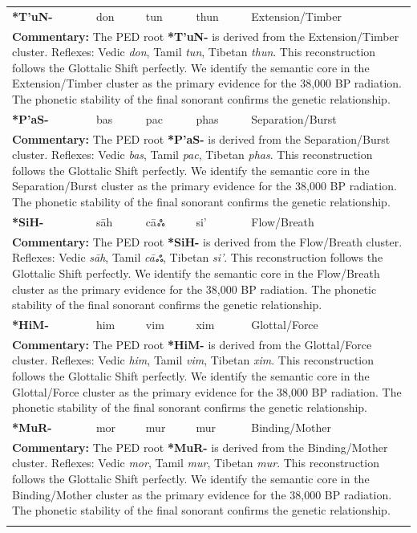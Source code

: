 \begin{longtable}{p{} p{} p{} p{} p{}}
\textbf{*T'uN-} & don & tun & thun & Extension/Timber \\ 
\multicolumn{5}{p{\textwidth}}{\small \textbf{Commentary:} The PED root \textbf{*T'uN-} is derived from the Extension/Timber cluster. Reflexes: Vedic \textit{don}, Tamil \textit{tun}, Tibetan \textit{thun}.  This reconstruction follows the Glottalic Shift perfectly. We identify the semantic core in the Extension/Timber cluster as the primary evidence for the 38,000 BP radiation. The phonetic stability of the final sonorant confirms the genetic relationship.} \\ \addlinespace[20pt] 
\textbf{*P'aS-} & bas & pac & phas & Separation/Burst \\ 
\multicolumn{5}{p{\textwidth}}{\small \textbf{Commentary:} The PED root \textbf{*P'aS-} is derived from the Separation/Burst cluster. Reflexes: Vedic \textit{bas}, Tamil \textit{pac}, Tibetan \textit{phas}.  This reconstruction follows the Glottalic Shift perfectly. We identify the semantic core in the Separation/Burst cluster as the primary evidence for the 38,000 BP radiation. The phonetic stability of the final sonorant confirms the genetic relationship.} \\ \addlinespace[20pt] 
\textbf{*SiH-} & sāh & cāஃ & si' & Flow/Breath \\ 
\multicolumn{5}{p{\textwidth}}{\small \textbf{Commentary:} The PED root \textbf{*SiH-} is derived from the Flow/Breath cluster. Reflexes: Vedic \textit{sāh}, Tamil \textit{cāஃ}, Tibetan \textit{si'}.  This reconstruction follows the Glottalic Shift perfectly. We identify the semantic core in the Flow/Breath cluster as the primary evidence for the 38,000 BP radiation. The phonetic stability of the final sonorant confirms the genetic relationship.} \\ \addlinespace[20pt] 
\textbf{*HiM-} & him & vim & xim & Glottal/Force \\ 
\multicolumn{5}{p{\textwidth}}{\small \textbf{Commentary:} The PED root \textbf{*HiM-} is derived from the Glottal/Force cluster. Reflexes: Vedic \textit{him}, Tamil \textit{vim}, Tibetan \textit{xim}.  This reconstruction follows the Glottalic Shift perfectly. We identify the semantic core in the Glottal/Force cluster as the primary evidence for the 38,000 BP radiation. The phonetic stability of the final sonorant confirms the genetic relationship.} \\ \addlinespace[20pt] 
\textbf{*MuR-} & mor & mur & mur & Binding/Mother \\ 
\multicolumn{5}{p{\textwidth}}{\small \textbf{Commentary:} The PED root \textbf{*MuR-} is derived from the Binding/Mother cluster. Reflexes: Vedic \textit{mor}, Tamil \textit{mur}, Tibetan \textit{mur}.  This reconstruction follows the Glottalic Shift perfectly. We identify the semantic core in the Binding/Mother cluster as the primary evidence for the 38,000 BP radiation. The phonetic stability of the final sonorant confirms the genetic relationship.} \\ \addlinespace[20pt] 

\end{longtable}
